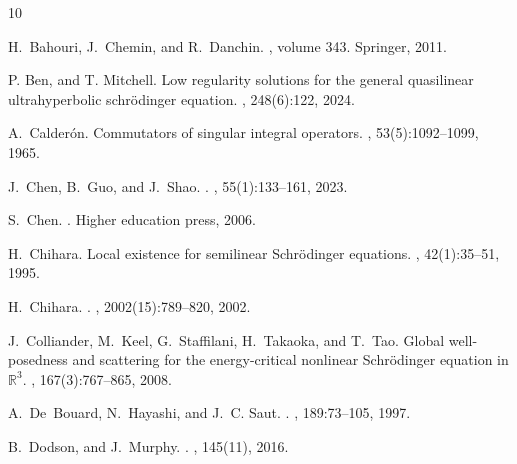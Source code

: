 \documentclass[10pt,twoside,a4paper]{article}
\numberwithin{equation}{section}\allowdisplaybreaks
\begin{document}
	\begin{center}
		
	\begin{thebibliography}{10}
		
		H.~Bahouri, J.~Chemin, and R.~Danchin.
		, volume 343.
		\newblock Springer, 2011.

		P. Ben,  and T. Mitchell. 
		\newblock Low regularity solutions for the general quasilinear ultrahyperbolic
		schr{\"o}dinger equation.
		, 248(6):122, 2024.
  
		A.~Calder{\'o}n.
		\newblock Commutators of singular integral operators.
		, 53(5):1092--1099, 1965.
		
		J.~Chen, B.~Guo, and J.~Shao.
		.
		, 55(1):133--161, 2023.
		
		S.~Chen.
		.
		\newblock Higher education press, 2006.
		
		H.~Chihara.
		\newblock Local existence for semilinear {S}chr\"{o}dinger equations.
		, 42(1):35--51, 1995.

H.~Chihara.
.
, 2002(15):789--820, 2002.

		J.~Colliander, M.~Keel, G.~Staffilani, H.~Takaoka, and T.~Tao.
		\newblock Global well-posedness and scattering for the energy-critical
		nonlinear {S}chr\"{o}dinger equation in {$\mathbb {R}^3$}.
		, 167(3):767--865, 2008.
		
		A.~De~Bouard, N.~Hayashi, and J.~C. Saut.
		.
		, 189:73--105, 1997.
		
		B.~Dodson, and J.~Murphy.
		.
		, 145(11), 2016.
		

\end{thebibliography}
\end{center}
\end{document}
